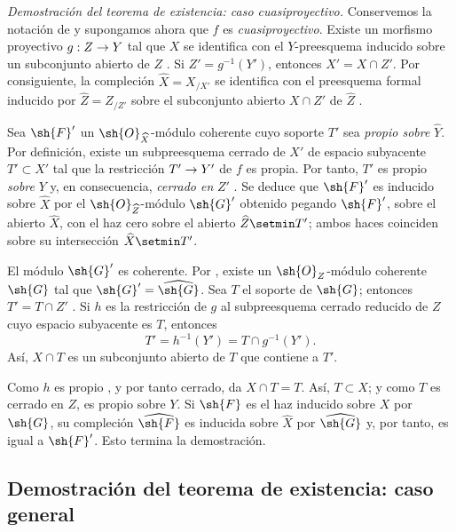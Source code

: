 \documentclass[oneside]{amsart}
\makeatletter
\newcommand{\ega@arrow}[2]{\mathchoice{#1}{#2}{#2}{#2}}
\renewcommand{\to}{\ega@arrow{\longrightarrow}{\rightarrow}}
\newcommand{\oldpage}[2][]{{\marginnote{\normalfont\textbf{#1}~|~#2}}\ignorespaces}
\let\EGAOriginalLabel\label
\renewcommand{\label}[1]{\phantomsection\EGAOriginalLabel{#1}}
\makeatother
\begin{document}
\begin{env}[5.2.6]
\label{III.5.2.6}
\emph{Demostración del teorema de existencia: caso cuasiproyectivo.}
Conservemos la notación de  y supongamos ahora que $f$
es \emph{cuasiproyectivo}. Existe un morfismo proyectivo
$g:Z\to Y$ tal que $X$ se identifica con el $Y$-preesquema
inducido sobre un subconjunto abierto de $Z$ . Si
$Z'=g^{-1}(Y')$, entonces $X'=X\cap Z'$. Por consiguiente, la compleción
$\widehat{X}=X_{/X'}$ se identifica con el preesquema formal
inducido por $\widehat{Z}=Z_{/Z'}$ sobre el subconjunto abierto $X\cap Z'$ de
$\widehat{Z}$ .

Sea $\sh{F}'$ un $\sh{O}_{\widehat{X}}$-módulo coherente cuyo
soporte $T'$ sea \emph{propio sobre} $\widehat{Y}$. Por definición, existe
un subpreesquema cerrado de $X'$ de espacio subyacente
$T'\subset X'$ tal que la restricción $T'\to Y'$ de $f$ es
propia. Por tanto, $T'$ es propio \emph{sobre} $Y$ y, en consecuencia, \emph{cerrado en}
$Z'$ . Se deduce que $\sh{F}'$ es inducido
sobre $\widehat{X}$ por el $\sh{O}_{\widehat{Z}}$-módulo $\sh{G}'$
obtenido pegando $\sh{F}'$, sobre el abierto $\widehat{X}$, con el
haz cero sobre el abierto $\widehat Z\setmin T'$; ambos haces coinciden sobre
su intersección $\widehat X\setmin T'$.

El módulo $\sh{G}'$ es coherente. Por , existe un
$\sh{O}_Z$-módulo coherente $\sh{G}$ tal que
$\sh{G}'=\widehat{\sh{G}}$. Sea $T$ el soporte de $\sh{G}$;
entonces $T'=T\cap Z'$ . Si $h$ es la restricción
de $g$ al subpreesquema cerrado reducido de $Z$ cuyo espacio subyacente
es $T$, entonces
\[
  T'=h^{-1}(Y')=T\cap g^{-1}(Y').
\]
Así, $X\cap T$ es un subconjunto abierto de $T$ que contiene a $T'$.

\oldpage[III]{154}
Como $h$ es propio , y por tanto cerrado,
 da $X\cap T=T$. Así, $T\subset X$; y
como $T$ es cerrado en $Z$, es propio sobre $Y$. Si $\sh{F}$ es
el haz inducido sobre $X$ por $\sh{G}$, su compleción
$\widehat{\sh{F}}$ es inducida sobre $\widehat{X}$ por
$\widehat{\sh{G}}$  y, por tanto, es igual a
$\sh{F}'$. Esto termina la demostración.
\end{env}


\subsection{Demostración del teorema de existencia: caso general}
\label{subsection:III.5.3}
\end{document}

